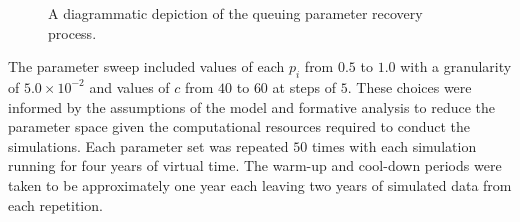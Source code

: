 \documentclass[11pt]{article}
\DeclareMathOperator*{\argmin}{arg\,min}
\begin{document}
\begin{figure}
{
    }
    \caption{%
        A diagrammatic depiction of the queuing parameter recovery process.
    }\label{fig:process}
\end{figure}

The parameter sweep included values of each \(p_i\) from \(0.5\)
to \(1.0\) with a granularity of \(5.0 \times 10^{-2}\) and values of \(c\) from
\(40\) to \(60\) at steps of \(5\).  These choices were informed by the
assumptions of the model and formative analysis to reduce the parameter space
given the computational resources required to conduct the simulations. Each
parameter set was repeated \(50\) times with each simulation running for four
years of virtual time. The warm-up and cool-down periods were taken to be
approximately one year each leaving two years of simulated data from each
repetition.
\end{document}
